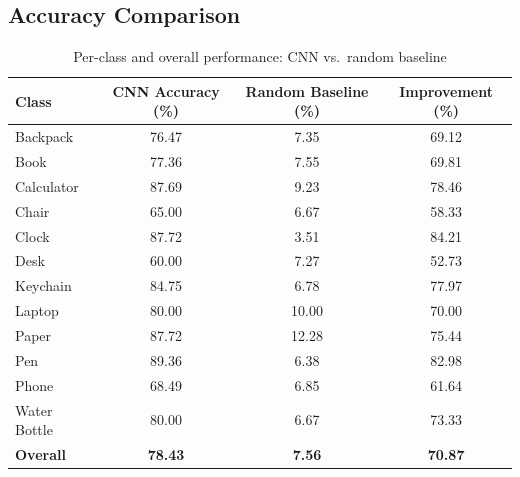 \documentclass[10pt]{article}
\begin{document}
\subsection{Accuracy Comparison}
\begin{table}[h!]
    \centering
    \caption{Per-class and overall performance: CNN vs.\ random baseline}
    \label{tab:test_summary}
        \begin{tabular}{|l|c|c|c|}
        \hline
        \textbf{Class}       & \textbf{CNN Accuracy (\%)} & \textbf{Random Baseline (\%)} & \textbf{Improvement (\%)} \\ \hline
        Backpack             & 76.47                      & 7.35                           & 69.12                     \\
        Book                 & 77.36                      & 7.55                           & 69.81                     \\
        Calculator           & 87.69                      & 9.23                           & 78.46                     \\
        Chair                & 65.00                      & 6.67                           & 58.33                     \\
        Clock                & 87.72                      & 3.51                           & 84.21                     \\
        Desk                 & 60.00                      & 7.27                           & 52.73                     \\
        Keychain             & 84.75                      & 6.78                           & 77.97                     \\
        Laptop               & 80.00                      & 10.00                          & 70.00                     \\
        Paper                & 87.72                      & 12.28                          & 75.44                     \\
        Pen                  & 89.36                      & 6.38                           & 82.98                     \\
        Phone                & 68.49                      & 6.85                           & 61.64                     \\
        Water Bottle         & 80.00                      & 6.67                           & 73.33                     \\ \hline
        \textbf{Overall}     & \textbf{78.43}             & \textbf{7.56}                  & \textbf{70.87}            \\ \hline
    \end{tabular}
\end{table}
\end{document}
